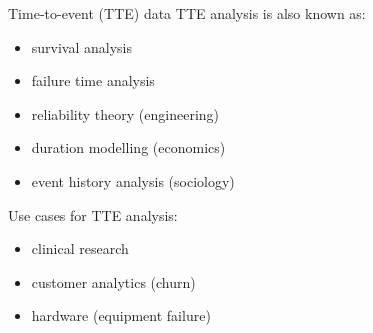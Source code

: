 \begin{frame}{Time-to-event (TTE) data}
    TTE analysis is also known as:
    \begin{itemize}
        \item survival analysis
        \item failure time analysis
        \item reliability theory (engineering)
        \item duration modelling (economics)
        \item event history analysis (sociology)
    \end{itemize}
    \pause
    Use cases for TTE analysis:
    \begin{itemize}
        \item clinical research
        \item customer analytics (churn)
        \item hardware (equipment failure)
    \end{itemize}
\end{frame}

